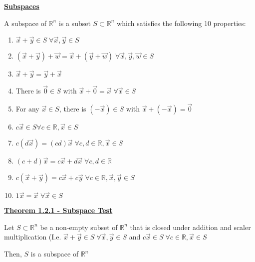 \documentclass{letter}
\newcommand{\0}[1]{\begin{bmatrix}#1\end{bmatrix}}
\newcommand{\h}[1]{\underline{\textbf{#1}}}
\begin{document}
	\h{Subspaces}
	
	A subspace of $\mathbb{R}^n$ is a subset $S \subset \mathbb{R}^n$ which satisfies the following 10 properties:
	\begin{enumerate}[$S_1$]
		\item $\vec x + \vec y \in S \;\forall \vec x, \vec y \in S$
		\item $(\vec x + \vec y) + \vec w = \vec x + (\vec y + \vec w) \;\forall \vec x, \vec y, \vec w \in S$
		\item $\vec x + \vec y = \vec y + \vec x$
		\item There is $\vec 0 \in S$ with $\vec x + \vec 0 = \vec x \;\forall \vec x \in S$
		\item For any $\vec x \in S$, there is $(-\vec x) \in S$ with $\vec x + (- \vec x) = \vec 0$
		\item $c \vec x \in S \forall c \in \mathbb{R}, \vec x \in S$
		\item $c(d\vec x) = (cd)\vec x \;\forall c, d \in \mathbb{R}, \vec x \in S$
		\item $(c+d) \vec x = c\vec x + d \vec x \;\forall c, d \in \mathbb{R}$
		\item $c(\vec x + \vec y) = c\vec x + c\vec y \;\forall c \in \mathbb{R}, \vec x, \vec y \in S$
		\item $1 \vec x = \vec x \;\forall \vec x \in S$
	\end{enumerate}
	
	\clearpage
	
	\h{Theorem 1.2.1 - Subspace Test}
	
	Let $S \subset \mathbb{R}^n$ be a non-empty subset of $\mathbb{R}^n$ that is closed under addition and scaler multiplication (I.e. $\vec x + \vec y \in S \; \forall \vec x, \vec y \in S$ and $c \vec x \in S \; \forall c \in \mathbb{R}, \vec x \in S$
	
	Then, $S$ is a subspace of $\mathbb{R}^n$
	
\end{document}
